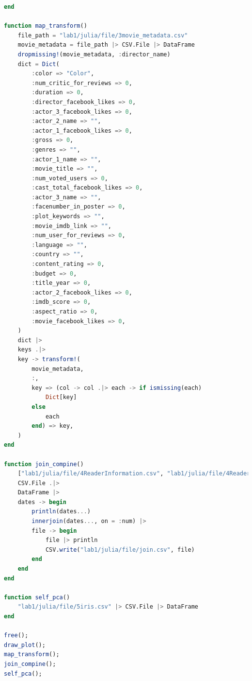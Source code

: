 \documentclass[a4paper]{article}
\begin{document}
\begin{lstlisting}[language=julia]
end

function map_transform()
    file_path = "lab1/julia/file/3movie_metadata.csv"
    movie_metadata = file_path |> CSV.File |> DataFrame
    dropmissing!(movie_metadata, :director_name)
    dict = Dict(
        :color => "Color",
        :num_critic_for_reviews => 0,
        :duration => 0,
        :director_facebook_likes => 0,
        :actor_3_facebook_likes => 0,
        :actor_2_name => "",
        :actor_1_facebook_likes => 0,
        :gross => 0,
        :genres => "",
        :actor_1_name => "",
        :movie_title => "",
        :num_voted_users => 0,
        :cast_total_facebook_likes => 0,
        :actor_3_name => "",
        :facenumber_in_poster => 0,
        :plot_keywords => "",
        :movie_imdb_link => "",
        :num_user_for_reviews => 0,
        :language => "",
        :country => "",
        :content_rating => 0,
        :budget => 0,
        :title_year => 0,
        :actor_2_facebook_likes => 0,
        :imdb_score => 0,
        :aspect_ratio => 0,
        :movie_facebook_likes => 0,
    )
    dict |>
    keys .|>
    key -> transform!(
        movie_metadata,
        :,
        key => (col -> col .|> each -> if ismissing(each)
            Dict[key]
        else
            each
        end) => key,
    )
end

function join_compine()
    ["lab1/julia/file/4ReaderInformation.csv", "lab1/julia/file/4ReaderRentRecode.csv"] .|>
    CSV.File .|>
    DataFrame |>
    dates -> begin
        println(dates...)
        innerjoin(dates..., on = :num) |>
        file -> begin
            file |> println
            CSV.write("lab1/julia/file/join.csv", file)
        end
    end
end

function self_pca()
    "lab1/julia/file/5iris.csv" |> CSV.File |> DataFrame
end

free();
draw_plot();
map_transform();
join_compine();
self_pca();

\end{lstlisting}
\end{document}
